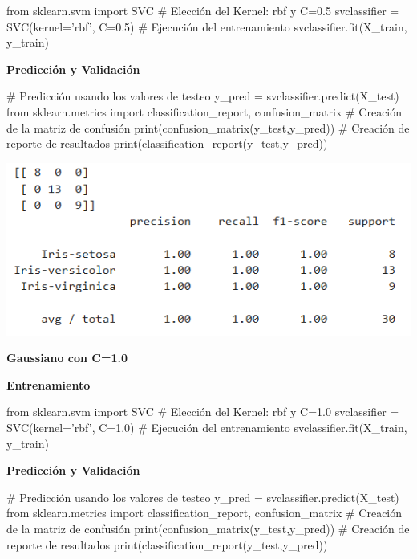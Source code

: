 \documentclass[paper=a4, fontsize=11pt]{scrartcl}
\numberwithin{equation}{section}		%
\numberwithin{figure}{section}			%
\numberwithin{table}{section}				%
\begin{document}
    \begin{python}
    from sklearn.svm import SVC
    # Elección del Kernel: rbf y C=0.5
    svclassifier = SVC(kernel='rbf', C=0.5)
    # Ejecución del entrenamiento
    svclassifier.fit(X_train, y_train)
    \end{python}

    \textbf{Predicción y Validación}
    
    \begin{python}
    # Predicción usando los valores de testeo
    y_pred = svclassifier.predict(X_test)
    from sklearn.metrics import classification_report, confusion_matrix
    # Creación de la matriz de confusión
    print(confusion_matrix(y_test,y_pred))
    # Creación de reporte de resultados
    print(classification_report(y_test,y_pred))
    \end{python}
    
    \includegraphics[scale=0.8]{gaussiano_c_05}
    \newpage
    
     \textbf{Gaussiano con C=1.0}
    
    \textbf{Entrenamiento}
    
    \begin{python}
    from sklearn.svm import SVC
    # Elección del Kernel: rbf y C=1.0
    svclassifier = SVC(kernel='rbf', C=1.0)
    # Ejecución del entrenamiento
    svclassifier.fit(X_train, y_train)
    \end{python}

    \textbf{Predicción y Validación}
    
    \begin{python}
    # Predicción usando los valores de testeo
    y_pred = svclassifier.predict(X_test)
    from sklearn.metrics import classification_report, confusion_matrix
    # Creación de la matriz de confusión
    print(confusion_matrix(y_test,y_pred))
    # Creación de reporte de resultados
    print(classification_report(y_test,y_pred))
    \end{python}
    
\end{document}
